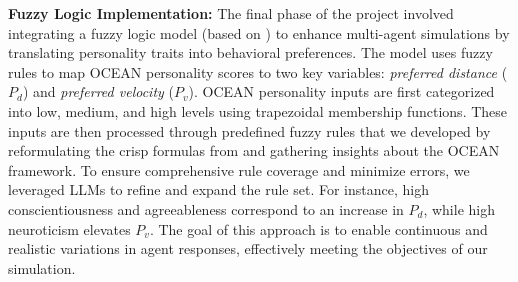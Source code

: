 \documentclass[12pt]{article}
\begin{document}
\begin{spacing}{1.15}
\begin{multicols}{2}
\noindent\textbf{Fuzzy Logic Implementation:}
The final phase of the project involved integrating a fuzzy logic model (based on \cite{fuzzylogic}) to enhance multi-agent simulations by translating personality traits into behavioral preferences. The model uses fuzzy rules to map OCEAN personality scores to two key variables: \textit{preferred distance} ($P_d$) and \textit{preferred velocity} ($P_v$). OCEAN personality inputs are first categorized into low, medium, and high levels using trapezoidal membership functions. These inputs are then processed through predefined fuzzy rules that we developed by reformulating the crisp formulas from \cite{emotionContagion} and gathering insights about the OCEAN framework. To ensure comprehensive rule coverage and minimize errors, we leveraged LLMs to refine and expand the rule set.
For instance, high conscientiousness and agreeableness correspond to an increase in $P_d$, while high neuroticism elevates $P_v$.
The goal of this approach is to enable continuous and realistic variations in agent responses, effectively meeting the objectives of our simulation.


    






\end{multicols}


\end{spacing}
\end{document}
